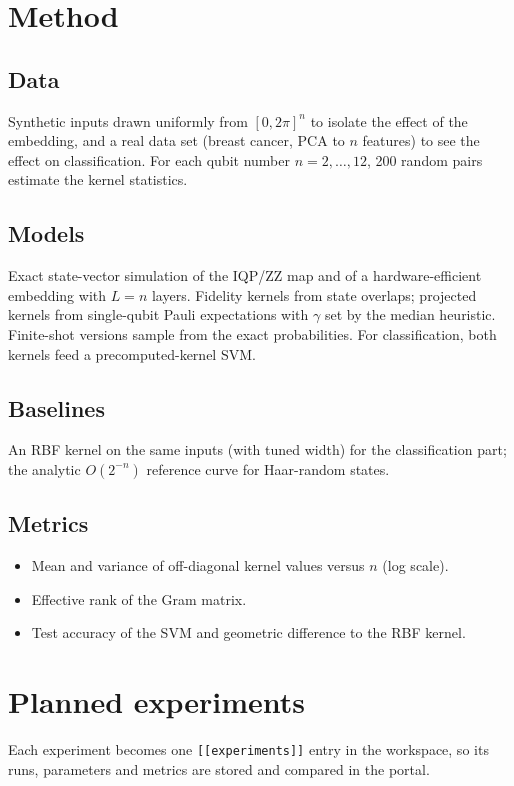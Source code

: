 \documentclass[11pt,a4paper]{article}
\begin{document}
\section{Method}
\subsection{Data}
Synthetic inputs drawn uniformly from $[0,2\pi]^n$ to isolate the effect of the embedding, and a
real data set (breast cancer, PCA to $n$ features) to see the effect on classification. For each
qubit number $n=2,\dots,12$, 200 random pairs estimate the kernel statistics.

\subsection{Models}
Exact state-vector simulation of the IQP/ZZ map and of a hardware-efficient embedding with $L=n$
layers. Fidelity kernels from state overlaps; projected kernels from single-qubit Pauli expectations
with $\gamma$ set by the median heuristic. Finite-shot versions sample from the exact probabilities.
For classification, both kernels feed a precomputed-kernel SVM.

\subsection{Baselines}
An RBF kernel on the same inputs (with tuned width) for the classification part; the analytic
$O(2^{-n})$ reference curve for Haar-random states.

\subsection{Metrics}
\begin{itemize}
  \item Mean and variance of off-diagonal kernel values versus $n$ (log scale).
  \item Effective rank of the Gram matrix.
  \item Test accuracy of the SVM and geometric difference to the RBF kernel.
\end{itemize}

\section{Planned experiments}
Each experiment becomes one \texttt{[[experiments]]} entry in the workspace, so its runs, parameters
and metrics are stored and compared in the portal.
\end{document}
